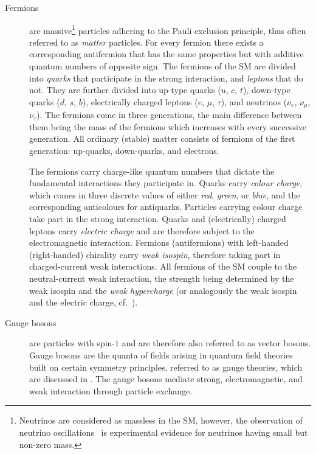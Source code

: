 \begin{description}

\item[Fermions] are massive\footnote{Neutrinos are considered as massless in the
    SM, however, the observation of neutrino
    oscillations~\cite{Super-Kamiokande:1998kpq,SNO:2002tuh} is experimental
    evidence for neutrinos having small but non-zero mass.} particles adhering
  to the Pauli exclusion principle, thus often referred to as \emph{matter}
  particles. For every fermion there exists a corresponding antifermion that has
  the same properties but with additive quantum numbers of opposite sign. The
  fermions of the SM are divided into \emph{quarks} that participate in the
  strong interaction, and \emph{leptons} that do not. They are further divided
  into up-type quarks ($u$, $c$, $t$), down-type quarks ($d$, $s$, $b$),
  electrically charged leptons ($e$, $\mu$, $\tau$), and neutrinos ($\nu_e$,
  $\nu_\mu$, $\nu_\tau$). The fermions come in three generations, the main
  difference between them being the mass of the fermions which increases with
  every successive generation. All ordinary (stable) matter consists of fermions
  of the first generation: up-quarks, down-quarks, and electrons.

  The fermions carry charge-like quantum numbers that dictate the fundamental
  interactions they participate in. Quarks carry \emph{colour charge}, which
  comes in three discrete values of either \emph{red}, \emph{green}, or
  \emph{blue}, and the corresponding anticolours for antiquarks. Particles
  carrying colour charge take part in the strong interaction. Quarks and
  (electrically) charged leptons carry \emph{electric charge} and are therefore
  subject to the electromagnetic interaction. Fermions (antifermions) with
  left-handed (right-handed) chirality carry \emph{weak isospin}, therefore
  taking part in charged-current weak interactions. All fermions of the SM
  couple to the neutral-current weak interaction, the strength being determined
  by the weak isospin and the \emph{weak hypercharge} (or analogously the weak
  isospin and the electric charge, cf.~).

\item[Gauge bosons] are particles with spin-$1$ and are therefore also referred
  to as vector bosons. Gauge bosons are the quanta of fields arising in quantum
  field theories built on certain symmetry principles, referred to as gauge
  theories, which are discussed in . The
  gauge bosons mediate strong, electromagnetic, and weak interaction through
  particle exchange.


\end{description}
